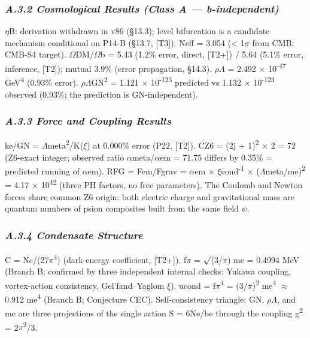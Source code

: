 \documentclass[11pt,letterpaper]{article}
\begin{document}
\subsubsection*{\itshape A.3.2  Cosmological Results (Class A --- b-independent)}

\noindent $\eta$B: derivation withdrawn in v86 (§13.3); level bifurcation is a candidate mechanism conditional on P14-B (§13.7, [T3]). Neff = 3.054 (< 1$\sigma$ from CMB; CMB-S4 target). $\Omega$DM/$\Omega$b = 5.43 (1.2\% error, direct, [T2+]) / 5.64 (5.1\% error, inference, [T2]); mutual 3.9\% (error propagation, §14.3). $\rho$$\Lambda$ = 2.492 $\times$ 10\textsuperscript{-47} GeV\textsuperscript{4} (0.93\% error). $\rho$$\Lambda$GN\textsuperscript{2} = 1.121 $\times$ 10\textsuperscript{-123} predicted vs 1.132 $\times$ 10\textsuperscript{-123} observed (0.93\%; the prediction is GN-independent).

\subsubsection*{\itshape A.3.3  Force and Coupling Results}

\noindent ke/GN = $\Lambda$meta\textsuperscript{2}/K($\xi$) at 0.000\% error (P22, [T2]). CZ6 = (2j + 1)\textsuperscript{2} $\times$ 2 = 72 (Z6-exact integer; observed ratio $\alpha$meta/$\alpha$em = 71.75 differs by 0.35\% = predicted running of $\alpha$em). RFG = Fem/Fgrav = $\alpha$em $\times$ $\xi$cond\textsuperscript{-1} $\times$ ($\Lambda$meta/me)\textsuperscript{2} = 4.17 $\times$ 10\textsuperscript{42} (three PH factors, no free parameters). The Coulomb and Newton forces share common Z6 origin: both electric charge and gravitational mass are quantum numbers of psion composites built from the same field $\psi$.

\subsubsection*{\itshape A.3.4  Condensate Structure}

\noindent C = Nc/(27$\pi$\textsuperscript{4}) (dark-energy coefficient, [T2+]). f$\pi$ = $\surd$(3/$\pi$) me = 0.4994 MeV (Branch B; confirmed by three independent internal checks: Yukawa coupling, vortex-action consistency, Gel'fand--Yaglom $\xi$). ucond = f$\pi$\textsuperscript{4} = (3/$\pi$)\textsuperscript{2} me\textsuperscript{4} $\approx$ 0.912 me\textsuperscript{4} (Branch B; Conjecture CEC). Self-consistency triangle: GN, $\rho$$\Lambda$, and me are three projections of the single action S = 6Ne/be through the coupling g\textsuperscript{2} = 2$\pi$\textsuperscript{2}/3.
\end{document}
